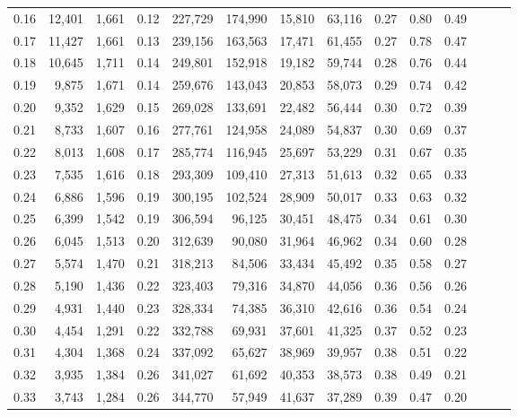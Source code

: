 \begin{tabular}{rrrrrrrrrrrrrr}
0.16 &  12,401 &  1,661 &  0.12 &  227,729 &  174,990 &  15,810 &  63,116 &  0.27 &  0.80 &      0.49 \\
0.17 &  11,427 &  1,661 &  0.13 &  239,156 &  163,563 &  17,471 &  61,455 &  0.27 &  0.78 &      0.47 \\
0.18 &  10,645 &  1,711 &  0.14 &  249,801 &  152,918 &  19,182 &  59,744 &  0.28 &  0.76 &      0.44 \\
0.19 &   9,875 &  1,671 &  0.14 &  259,676 &  143,043 &  20,853 &  58,073 &  0.29 &  0.74 &      0.42 \\
0.20 &   9,352 &  1,629 &  0.15 &  269,028 &  133,691 &  22,482 &  56,444 &  0.30 &  0.72 &      0.39 \\
0.21 &   8,733 &  1,607 &  0.16 &  277,761 &  124,958 &  24,089 &  54,837 &  0.30 &  0.69 &      0.37 \\
0.22 &   8,013 &  1,608 &  0.17 &  285,774 &  116,945 &  25,697 &  53,229 &  0.31 &  0.67 &      0.35 \\
0.23 &   7,535 &  1,616 &  0.18 &  293,309 &  109,410 &  27,313 &  51,613 &  0.32 &  0.65 &      0.33 \\
0.24 &   6,886 &  1,596 &  0.19 &  300,195 &  102,524 &  28,909 &  50,017 &  0.33 &  0.63 &      0.32 \\
0.25 &   6,399 &  1,542 &  0.19 &  306,594 &   96,125 &  30,451 &  48,475 &  0.34 &  0.61 &      0.30 \\
0.26 &   6,045 &  1,513 &  0.20 &  312,639 &   90,080 &  31,964 &  46,962 &  0.34 &  0.60 &      0.28 \\
0.27 &   5,574 &  1,470 &  0.21 &  318,213 &   84,506 &  33,434 &  45,492 &  0.35 &  0.58 &      0.27 \\
0.28 &   5,190 &  1,436 &  0.22 &  323,403 &   79,316 &  34,870 &  44,056 &  0.36 &  0.56 &      0.26 \\
0.29 &   4,931 &  1,440 &  0.23 &  328,334 &   74,385 &  36,310 &  42,616 &  0.36 &  0.54 &      0.24 \\
0.30 &   4,454 &  1,291 &  0.22 &  332,788 &   69,931 &  37,601 &  41,325 &  0.37 &  0.52 &      0.23 \\
0.31 &   4,304 &  1,368 &  0.24 &  337,092 &   65,627 &  38,969 &  39,957 &  0.38 &  0.51 &      0.22 \\
0.32 &   3,935 &  1,384 &  0.26 &  341,027 &   61,692 &  40,353 &  38,573 &  0.38 &  0.49 &      0.21 \\
0.33 &   3,743 &  1,284 &  0.26 &  344,770 &   57,949 &  41,637 &  37,289 &  0.39 &  0.47 &      0.20 \\

\end{tabular}

